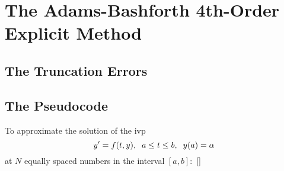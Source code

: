 \documentclass[12pt,oneside]{book}
\begin{document}
		\clearpage
	\section{The Adams-Bashforth 4th-Order Explicit Method} \label{m:ab4e}
		\begin{spacing}{1.2}
			
			
			
			\subsection*{The Truncation Errors}
			
			
			\subsection{The Pseudocode}
				To approximate the solution of the \ac{ivp} 
				\[ y' = f(t,y), \hspace*{0.2cm} a \leq t \leq b, \hspace*{0.2cm} y(a) = \alpha \]
				at $ N $ equally spaced numbers in the interval $ [a, b]: $ []
				
			
		\end{spacing}
		
\end{document}
